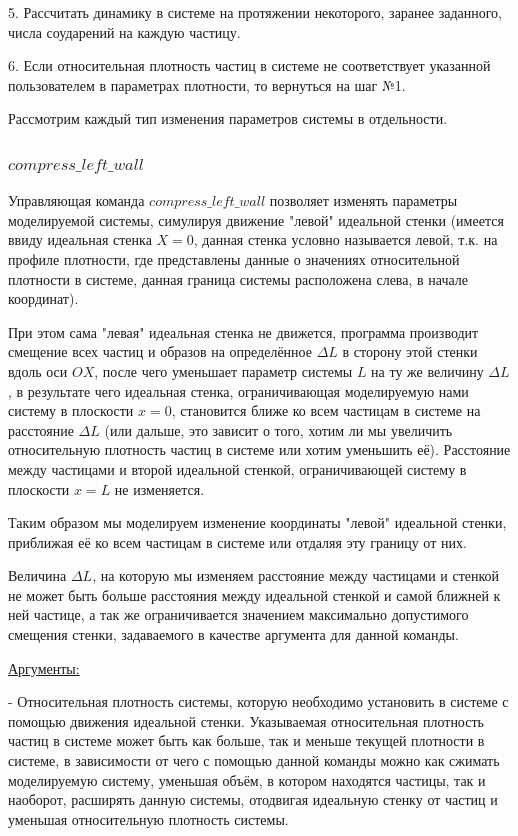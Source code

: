 \documentclass[a4paper]{article}
\begin{document}
5. Рассчитать динамику в системе на протяжении некоторого, заранее заданного, числа соударений на каждую частицу.

6. Если относительная плотность частиц в системе не соответствует указанной пользователем в параметрах плотности, то вернуться на шаг №1.

Рассмотрим каждый тип изменения параметров системы в отдельности.

\subsubsection{$ compress\_left\_wall $}
Управляющая команда $ compress\_left\_wall $ позволяет изменять параметры моделируемой системы, симулируя движение "левой" идеальной стенки (имеется ввиду идеальная стенка $ X = 0 $, данная стенка условно называется левой, т.к. на профиле плотности, где представлены данные о значениях относительной плотности в системе, данная граница системы расположена слева, в начале координат).

При этом сама "левая" идеальная стенка не движется, программа производит смещение всех частиц и образов на определённое $ \Delta L $ в сторону этой стенки вдоль оси $ OX $, после чего уменьшает параметр системы $ L $ на ту же величину $ \Delta L $, в результате чего идеальная стенка, ограничивающая моделируемую нами систему в плоскости $ x = 0 $, становится ближе ко всем частицам в системе на расстояние $ \Delta L $ (или дальше, это зависит о того, хотим ли мы увеличить относительную плотность частиц в системе или хотим уменьшить её). Расстояние между частицами и второй идеальной стенкой, ограничивающей систему в плоскости $ x = L $ не изменяется.

Таким образом мы моделируем изменение координаты "левой" идеальной стенки, приближая её ко всем частицам в системе или отдаляя эту границу от них.

Величина $ \Delta L $, на которую мы изменяем расстояние между частицами и стенкой не может быть больше расстояния между идеальной стенкой и самой ближней к ней частице, а так же ограничивается значением максимально допустимого смещения стенки, задаваемого в качестве аргумента для данной команды.

\uline{Аргументы:}

- Относительная плотность системы, которую необходимо установить в системе с помощью движения идеальной стенки. Указываемая относительная плотность частиц в системе может быть как больше, так и меньше текущей плотности в системе, в зависимости от чего с помощью данной команды можно как сжимать моделируемую систему, уменьшая объём, в котором находятся частицы, так и наоборот, расширять данную системы, отодвигая идеальную стенку от частиц и уменьшая относительную плотность системы.
\end{document}
